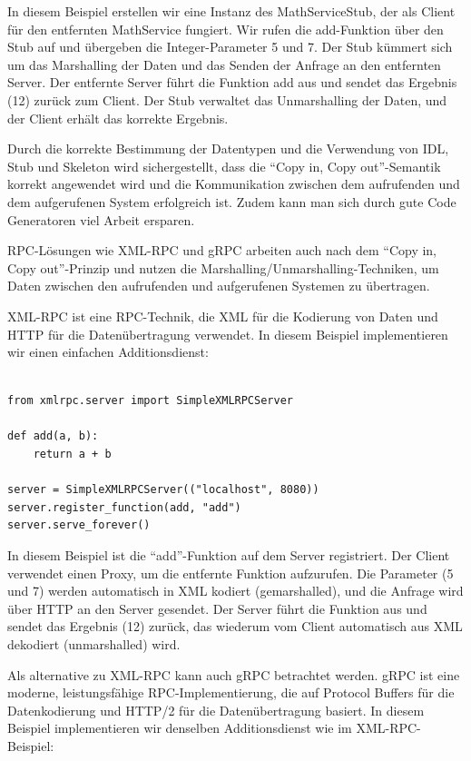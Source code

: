 \documentclass[../vs-script-first-v01.tex]{subfiles}
\begin{document}
In diesem Beispiel erstellen wir eine Instanz des MathServiceStub, der als Client für den entfernten MathService fungiert. Wir rufen die add-Funktion über den Stub auf und übergeben die Integer-Parameter 5 und 7. Der Stub kümmert sich um das Marshalling der Daten und das Senden der Anfrage an den entfernten Server. Der entfernte Server führt die Funktion add aus und sendet das Ergebnis (12) zurück zum Client. Der Stub verwaltet das Unmarshalling der Daten, und der Client erhält das korrekte Ergebnis.

Durch die korrekte Bestimmung der Datentypen und die Verwendung von IDL, Stub und Skeleton wird sichergestellt, dass die \enquote{Copy in, Copy out}-Semantik korrekt angewendet wird und die Kommunikation zwischen dem aufrufenden und dem aufgerufenen System erfolgreich ist. Zudem kann man sich durch gute Code Generatoren viel Arbeit ersparen. 

RPC-Lösungen wie XML-RPC und gRPC arbeiten auch nach dem \enquote{Copy in, Copy out}-Prinzip und nutzen die Marshalling/Unmarshalling-Techniken, um Daten zwischen den aufrufenden und aufgerufenen Systemen zu übertragen. 

XML-RPC ist eine RPC-Technik, die XML für die Kodierung von Daten und HTTP für die Datenübertragung verwendet. In diesem Beispiel implementieren wir einen einfachen Additionsdienst:\\\\

\noindent\begin{minipage}{\textwidth}
\begin{lstlisting}[caption={XML-RPC in Python},captionpos=b,label={lst:xmp-rpc-python}]
from xmlrpc.server import SimpleXMLRPCServer

def add(a, b):
    return a + b

server = SimpleXMLRPCServer(("localhost", 8080))
server.register_function(add, "add")
server.serve_forever()
\end{lstlisting}
\end{minipage}

In diesem Beispiel ist die \enquote{add}-Funktion auf dem Server registriert. Der Client verwendet einen Proxy, um die entfernte Funktion aufzurufen. Die Parameter (5 und 7) werden automatisch in XML kodiert (gemarshalled), und die Anfrage wird über HTTP an den Server gesendet. Der Server führt die Funktion aus und sendet das Ergebnis (12) zurück, das wiederum vom Client automatisch aus XML dekodiert (unmarshalled) wird.

Als alternative zu XML-RPC kann auch gRPC betrachtet werden. gRPC ist eine moderne, leistungsfähige RPC-Implementierung, die auf Protocol Buffers für die Datenkodierung und HTTP/2 für die Datenübertragung basiert. In diesem Beispiel implementieren wir denselben Additionsdienst wie im XML-RPC-Beispiel:
\end{document}
